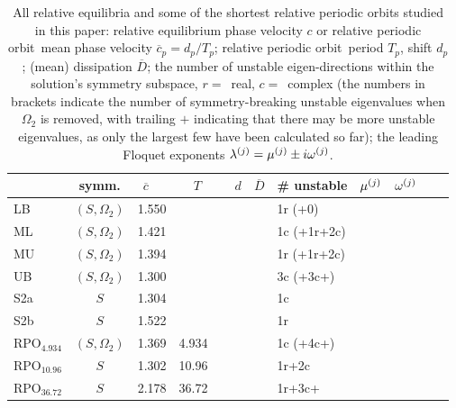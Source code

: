\documentclass[aip,cha,showpacs,reprint]{revtex4-1} %
\newcommand{\eigExp}[1][]{
\ifthenelse{\equal{#1}{}}{\ensuremath{\lambda}}{\ensuremath{\lambda^{(#1)}}}
                        }
\newcommand{\eigRe}[1][]{
\ifthenelse{\equal{#1}{}}{\ensuremath{\mu}}{\ensuremath{\mu^{(#1)}}}
                        }
\newcommand{\eigIm}[1][]{
  \ifthenelse{\equal{#1}{}}{\ensuremath{\omega}}{\ensuremath{\omega^{(#1)}}}
            }
\newcommand{\period}[1]{{\ensuremath{T_{#1}}}}
\newcommand{\shift}{\ensuremath{d}}
\newcommand{\rpo}{rela\-ti\-ve periodic orbit}
\newcommand{\RPO}[1]{\ensuremath{\mathrm{RPO}_{#1}}}
\newcommand{\velRel}{\ensuremath{c}}    %
\newcommand{\timeAver} [1]{\overline{#1}}
\begin{document}
\begin{table}
   \caption{\label{tab:RPOs}
      All rela\-ti\-ve equilib\-ria and some of the shortest \rpo s studied in this
      paper: rela\-ti\-ve equilib\-rium phase velocity $\velRel$ or \rpo\ mean phase velocity
      $\timeAver{\velRel}_p= \shift_p/\period{p}$; \rpo\ period
      $\period{p}$, shift $\shift_p$; (mean) dissipation $\timeAver{D}$;
      the number of unstable eigen-directions within the solution's
      symmetry subspace, $r= $~real, $c= $~complex (the numbers in
      brackets indicate the number of symmetry-breaking unstable
      eigenvalues when $\Omega_2$ is removed, with trailing $+$
      indicating that there may be more unstable eigenvalues, as only the
      largest few have been calculated so far); the leading  Floquet
      exponents $\eigExp[j]= \eigRe[j] \pm i\eigIm[j]$.
   }
   \centering
   \begin{tabular}{lclllllllll}
       & symm.           & $~~\timeAver{\velRel}$
                                   & ~~$\period{}$ &  ~~$\shift$
                                   & $\timeAver{D}$
                                   & \# unstable
                                   & $\eigRe[j]$ & $\eigIm[j]$
                                   \\
   \hline
   LB  &  $(S,\Omega_2)$  & 1.550 &&&& 1r (+0) \\ %
   ML  &  $(S,\Omega_2)$  & 1.421 &&&& 1c (+1r+2c) \\ %
   MU  &  $(S,\Omega_2)$  & 1.394 &&&& 1r (+1r+2c) \\ %
   UB  &  $(S,\Omega_2)$  & 1.300 &&&& 3c (+3c+)  \\ %
   S2a &  $S$              & 1.304 &&&& 1c   \\ %
   S2b &  $S$              & 1.522 &&&& 1r   \\ %
   $\RPO{4.934}$ &  $(S,\Omega_2)$  & 1.369 & 4.934 &&& 1c (+4c+) \\ %
   $\RPO{10.96}$ &  $S$    & 1.302 & 10.96 &&& 1r+2c  \\ %
   $\RPO{36.72}$ &  $S$    & 2.178 & 36.72 &&& 1r+3c+  %
   \end{tabular}
\end{table}
\end{document}

